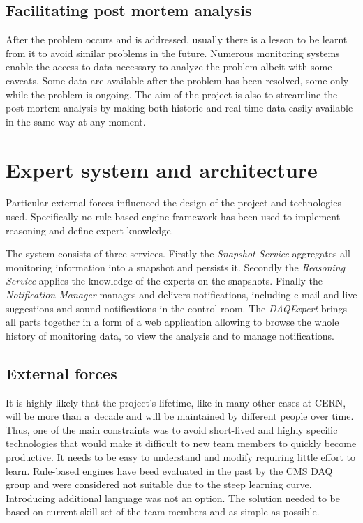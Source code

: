 \documentclass[a4paper]{jpconf}
\begin{document}
\subsection{Facilitating post mortem analysis}
After the problem occurs and is addressed, usually there is a lesson to be learnt from it to avoid similar problems in the future. Numerous monitoring systems enable the access to data necessary to analyze the problem albeit with some caveats. Some data are available after the problem has been resolved, some only while the problem is ongoing. The aim of the project is also to streamline the post mortem analysis by making both historic and real-time data easily available in the same way at any moment.

\section{Expert system and architecture}
Particular external forces influenced the design of the project and technologies used. Specifically no rule-based engine framework has been used to implement reasoning and define expert knowledge.

The system consists of three services. Firstly the {\it Snapshot Service} aggregates all monitoring information into a snapshot and persists it. Secondly the { \it Reasoning Service} applies the knowledge of the experts on the snapshots. Finally the { \it Notification Manager } manages and delivers notifications, including e-mail and live suggestions and sound notifications in the control room. The { \it DAQExpert } brings all parts together in a form of a web application allowing to browse the whole history of monitoring data, to view the analysis and to manage notifications.

\subsection{External forces}
It is highly likely that the project's lifetime, like in many other cases at CERN, will be more than a~decade and will be maintained by different people over time. Thus, one of the main constraints was to avoid short-lived and highly specific technologies that would make it difficult to new team members to quickly become productive. It needs to be easy to understand and modify requiring little effort to learn. Rule-based engines have beed evaluated in the past by the CMS DAQ group and were considered not suitable due to the steep learning curve. Introducing additional language was not an option. The solution needed to be based on current skill set of the team members and as simple as possible.
\end{document}
